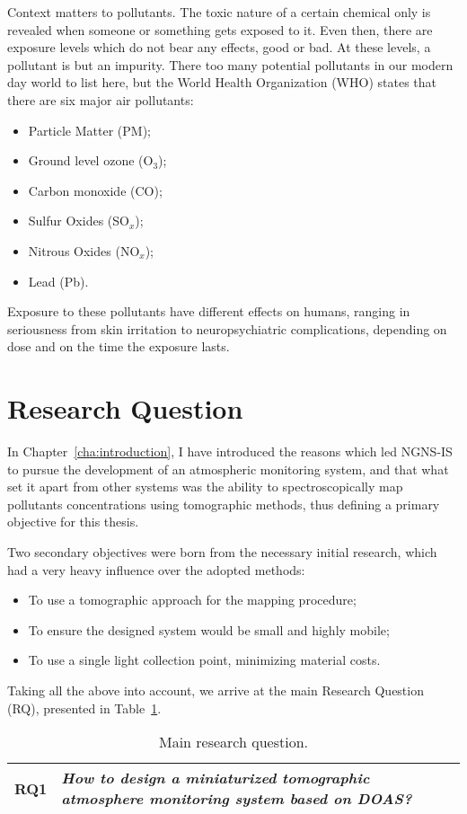 Context matters to pollutants. The toxic nature of a certain chemical
only is revealed when someone or something gets exposed to it. Even
then, there are exposure levels which do not bear any effects, good or
bad. At these levels, a pollutant is but an impurity. There too many
potential pollutants in our modern day world to list here, but the World
Health Organization (\gls{WHO}) states that there are six major air
pollutants:
\begin{itemize}
    \item Particle Matter (\gls{PM});
    \item Ground level ozone (O$_3$);
    \item Carbon monoxide (CO);
    \item Sulfur Oxides (SO$_x$);
    \item Nitrous Oxides (NO$_x$);
    \item Lead (Pb).
\end{itemize}

Exposure to these pollutants have different effects on humans, ranging in
seriousness from skin irritation to neuropsychiatric complications,
depending on dose and on the time the exposure lasts.

\section{Research Question}%
\label{sec:research_question}

In Chapter~\ref{cha:introduction}, I have introduced the reasons which
led NGNS-IS to pursue the development of an atmospheric monitoring
system, and that what set it apart from other systems was the ability to
spectroscopically map pollutants concentrations using tomographic
methods, thus defining a primary objective for this thesis.

Two secondary objectives were born from the necessary initial research,
which had a very heavy influence over the adopted methods:
\begin{itemize}
    \item To use a tomographic approach for the mapping procedure;
    \item To ensure the designed system would be small and highly
        mobile;
    \item To use a single light collection point, minimizing material
        costs.
\end{itemize}

Taking all the above into account, we arrive at the main Research
Question (\gls{RQ}), presented in Table~\ref{tab:RQ1}.
\begin{table}[htpb]
    \centering
    \caption{Main research question.}
    \label{tab:RQ1}
    \begin{tabularx}{0.8\textwidth}{cX}
        \toprule
        \textbf{RQ1}&\emph{ How to design a miniaturized tomographic
        atmosphere monitoring system based on DOAS? }\\
        \bottomrule
    \end{tabularx}
\end{table}

